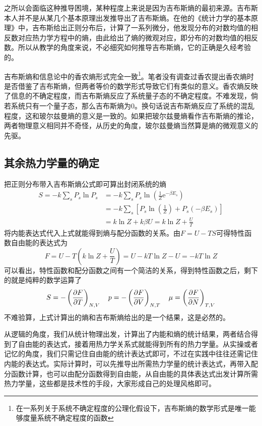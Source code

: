 \documentclass[../../main.tex]{subfiles}
\begin{document}
之所以会面临这种推导困境，某种程度上来说是因为吉布斯熵的最初来源。吉布斯本人并不是从某几个基本原理出发推导出了吉布斯熵。在他的《统计力学的基本原理》中，吉布斯给出正则分布后，计算了一系列微分，他发现分布的对数均值的相反数对应热力学方程中的熵，由此给出了熵的微观对应，即分布的对数均值的相反数。所以从教学的角度来说，不必细究如何推导吉布斯熵，它的正确是久经考验的。

吉布斯熵和信息论中的香农熵形式完全一致\footnote{在一系列关于系统不确定程度的公理化假设下，吉布斯熵的数学形式是唯一能够度量系统不确定程度的函数}。笔者没有调查过香农提出香农熵时是否借鉴了吉布斯熵，但两者等价的数学形式导致它们有类似的意义。香农熵反映了信息的不确定程度，而吉布斯熵反应了系统量子态的不确定程度。不难发现，倘若系统只有一个量子态，那么吉布斯熵为0。换句话说吉布斯熵反应了系统的混乱程度，这和玻尔兹曼熵的意义是一致的。如果把玻尔兹曼熵看作吉布斯熵的推论，两者物理意义相同并不奇怪，从历史的角度，玻尔兹曼熵当然算是熵的微观意义的先驱。

\subsection{其余热力学量的确定}

把正则分布带入吉布斯熵公式即可算出封闭系统的熵
\begin{equation}
    \begin{split}
        S=-k\sum_s P_s\ln P_s&=-k\sum_s P_s\ln(\frac{1}{Z}\mathrm{e}^{-\beta E_s}) \\
        &=-k\sum_s\left[P_s\ln(\frac{1}{Z})+P_s(-\beta E_s)\right] \\
        &=k\ln Z+k\beta U=k\ln Z+\frac{U}{T}
    \end{split}
\end{equation}
将内能表达式代入上式就能得到熵与配分函数的关系。由\(F=U-TS\)可得特性函数自由能的表达式为
\begin{equation}
    F=U-T\left(k\ln Z+\frac{U}{T}\right)=U-kT\ln Z-U=-kT\ln Z
\end{equation}
可以看出，特性函数和配分函数之间有一个简洁的关系，得到特性函数之后，剩下的就是纯粹的数学运算了
\begin{equation}
    S=-\left(\pdv{F}{T}\right)_{N,V} \quad p=-\left(\pdv{F}{V}\right)_{N,T}\quad \mu=\left(\pdv{F}{N}\right)_{T,V}
\end{equation}
不难验算，上式计算出的熵和吉布斯熵给出的是一个结果，这是必然的。

从逻辑的角度，我们从统计物理出发，计算出了内能和熵的统计结果，两者结合得到了自由能的表达式，接着用热力学关系式就能得到所有的热力学量。从实操或者记忆的角度，我们只需记住自由能的统计表达式即可，不过在实践中往往还需记住内能的表达式。实际计算时，可以先推导出所需热力学量的统计表达式，再带入配分函数计算，也可以由配分函数得到自由能，从自由能的具体表达式出发计算所需热力学量，这些都是技术性的手段，大家形成自己的处理风格即可。
\end{document}
